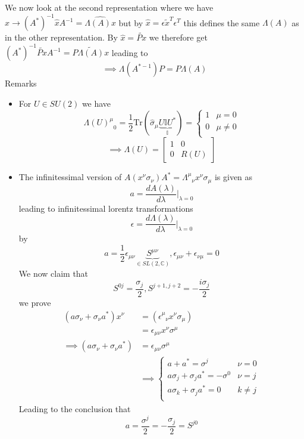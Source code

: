 \documentclass{report}
\begin{document}
We now look at the second representation where we have $\hat{x} \to \left( A^{*} \right) ^{-1} \hat{x} A^{-1} = \hat{\Lambda\left( A \right) x} $ but by $\hat{x} = \epsilon \tilde{x}^{T} \epsilon^{T} $ this defines the same $\Lambda\left( A \right) $ as in the other representation.
By $\hat{x}  = \tilde{Px}$ we therefore get $  \left( A^{*}  \right) ^{-1}  \tilde{Px} A^{-1} = \tilde{P \Lambda\left( A \right) x}$ leading to \[
\implies \Lambda\left( A^{*-1}  \right) P = P \Lambda \left( A \right) 
\] 
Remarks
\begin{itemize}
  \item For $U \in SU( 2 )$ we have \[
  \Lambda\left( U \right)^{\mu} _{\text{ }0} = \frac{1}{2} \text{Tr}\left( \hat{\sigma}_\mu \underbrace{U \mathbb{I} U^{*} }_{\mathbb{I}}   \right) = \begin{cases}
    1 & \mu = 0 \\
    0 &  \mu \neq 0 \\
  \end{cases}
  \] \[
  \implies \Lambda\left( U \right) = 
  \begin{bmatrix}
    1 & 0 \\
    0 & R\left( U \right) 
  \end{bmatrix}
  \] 
\item The infinitessimal version of $A \left( x^{\nu} \sigma_\nu \right) A^{*} = \Lambda^{\mu}_{\text{ }\nu} x^{\nu} \sigma_\mu$ is given as \[
a = \frac{dA\left( \lambda \right) }{d \lambda}|_{\lambda = 0} 
\] leading to infinitessimal lorentz transformations \[
\epsilon = \frac{d \Lambda\left( \lambda \right) }{d \lambda} |_{\lambda = 0} 
\] by  \[
a = \frac{1}{2} \epsilon_{\mu\nu} \underbrace{S^{\mu\nu} }_{\in SL\left( 2, \mathbb{C} \right) }  , \epsilon_{\mu\nu} + \epsilon_{\nu\mu} =0
\] We now claim that \[
S^{0j}  = \frac{\sigma_j}{2} , S^{j+1, j+2} = - \frac{i\sigma_j}{2} 
\] we prove
\begin{align*}
  \left( a\sigma_\nu + \sigma_\nu a^{*}  \right) x^{\nu} &= \left( \epsilon^{\mu} _{\text{ }\nu} x^{\nu} \sigma_\mu \right)  \\
             &= \epsilon_{\mu\nu} x^{\nu} \sigma^\mu \\
  \implies \left( a \sigma_\nu + \sigma_\nu a^{*}  \right) &=  \epsilon_{\mu\nu} \sigma^{\mu}   \\
  &\implies \begin{cases}
    a + a^{*} = \sigma^{j}  & \nu = 0 \\
    a \sigma_j + \sigma_j a^{*} = - \sigma^{0}  & \nu = j \\
    a \sigma_k + \sigma_j a^{*} = 0 & k \neq j \\
  \end{cases}
\end{align*}
  Leading to the conclusion that \[
  a = \frac{\sigma^{j} }{2} = - \frac{\sigma_j}{2} = S^{j 0} 
  \] 
\end{itemize}
\end{document}
